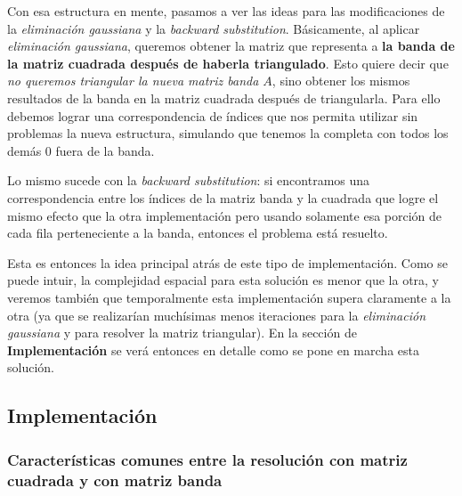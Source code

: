 \vspace{\baselineskip}

\vspace{\baselineskip}
\par

Con esa estructura en mente, pasamos a ver las ideas para las modificaciones de la \textit{eliminación gaussiana} y la \textit{backward substitution}. Básicamente, al aplicar \textit{eliminación gaussiana}, queremos obtener la matriz que representa a \textbf{la banda de la matriz cuadrada después de haberla triangulado}. Esto quiere decir que \textit{no queremos triangular la nueva matriz banda $A$}, sino obtener los mismos resultados de la banda en la matriz cuadrada después de triangularla. Para ello debemos lograr una correspondencia de índices que nos permita utilizar sin problemas la nueva estructura, simulando que tenemos la completa con todos los demás 0 fuera de la banda.

Lo mismo sucede con la \textit{backward substitution}: si encontramos una correspondencia entre los índices de la matriz banda y la cuadrada que logre el mismo efecto que la otra implementación pero usando solamente esa porción de cada fila perteneciente a la banda, entonces el problema está resuelto.

\vspace{\baselineskip}
Esta es entonces la idea principal atrás de este tipo de implementación. Como se puede intuir, la complejidad espacial para esta solución es menor que la otra, y veremos también que temporalmente esta implementación supera claramente a la otra (ya que se realizarían muchísimas menos iteraciones para la \textit{eliminación gaussiana} y para resolver la matriz triangular). En la sección de \textbf{Implementación} se verá entonces en detalle como se pone en marcha esta solución.

\subsection{Implementación}

\subsubsection{Características comunes entre la resolución con matriz cuadrada y con matriz banda}

